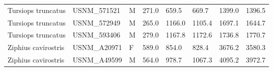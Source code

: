 \begin{longtable}{|p{1.95in}p{1.1in}p{.15in}p{.4in}p{.4in}p{.4in}p{.4in}p{.4in}|}
  Tursiops truncatus & USNM\_571521 & M & 271.0 & 659.5 & 669.7 & 1399.0 & 1396.5 \\ 
  Tursiops truncatus & USNM\_572949 & M & 265.0 & 1166.0 & 1105.4 & 1697.1 & 1644.7 \\ 
  Tursiops truncatus & USNM\_593406 & M & 279.0 & 1167.8 & 1172.6 & 1736.8 & 1770.7 \\ 
  Ziphius cavirostris & USNM\_A20971 & F & 589.0 & 854.0 & 828.4 & 3676.2 & 3580.3 \\ 
  Ziphius cavirostris & USNM\_A49599 & M & 564.0 & 978.7 & 1067.3 & 4095.2 & 3972.7 \\ 
   \hline
\end{longtable}


\small

